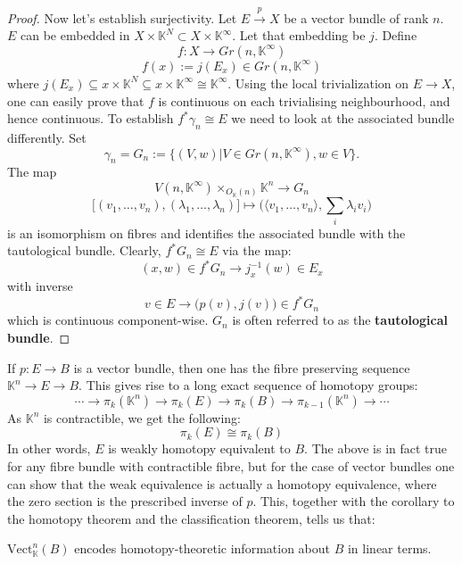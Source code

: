 \documentclass[11pt,a4paper]{article}
\begin{document}
\begin{proof}
Now let's establish surjectivity. Let $E\xrightarrow{p} X$ be a vector bundle of rank $n$. $E$ can be embedded in $X\times \mathbb{K}^N \subset X\times \mathbb{K}^{\infty}$. Let that embedding be $j$. Define
$$f:X \rightarrow Gr(n, \mathbb{K}^{\infty})$$
$$f(x) := j(E_x) \in Gr(n, \mathbb{K}^{\infty})$$
    where $j(E_x) \subseteq x\times \mathbb{K}^N \subseteq x\times \mathbb{K}^{\infty} \cong \mathbb{K}^{\infty}$. Using the local trivialization on $E\rightarrow X$, one can easily prove that $f$ is continuous on each trivialising neighbourhood, and hence continuous. To establish $f^*\gamma_n \cong E$ we need to look at the associated bundle differently. Set
    $$\gamma_n=G_n:= \{(V, w)  |  V \in Gr(n, \mathbb{K}^{\infty}), w\in V\}.$$
The map
$$V(n,\mathbb K^\infty)\times_{O_{\mathbb K}(n)}\mathbb K^n\longrightarrow G_n$$
$$\big[(v_1,\ldots,v_n),(\lambda_1,\ldots,\lambda_n)\big]\longmapsto
\bigg(\langle v_1,\ldots,v_n\rangle,\sum_i\lambda_i v_i\bigg)$$
is an isomorphism on fibres and identifies the associated bundle with the tautological bundle.
    Clearly, $f^*G_n \cong E$ via the map:
$$(x,w)\in f^*G_n \rightarrow j_x^{-1}(w)\in E_x$$
with inverse
$$v\in E \rightarrow \big(p(v), j(v)\big) \in f^*G_n$$
which is continuous component-wise. $G_n$ is often referred to as the \textbf{tautological bundle}.
\end{proof}

\begin{remark}
If $p:E\rightarrow B$ is a vector bundle, then one has the fibre preserving sequence $\mathbb{K}^n \rightarrow E\rightarrow B$. This gives rise to a long exact sequence of homotopy groups:
$$\cdots\rightarrow\pi_k(\mathbb{K}^n) \rightarrow \pi_k(E) \rightarrow \pi_k(B) \rightarrow \pi_{k-1}(\mathbb{K}^{n})\rightarrow \cdots$$
As $\mathbb{K}^n$ is contractible, we get the following:
$$\pi_k(E) \cong \pi_k(B)$$
In other words, $E$ is weakly homotopy equivalent to $B$. The above is in fact true for any fibre bundle with contractible fibre, but for the case of vector bundles one can show that the weak equivalence is actually a homotopy equivalence, where the zero section is the prescribed inverse of $p$. This, together with the corollary to the homotopy theorem and the classification theorem, tells us that:
\end{remark}

\begin{center}

$\text{Vect}_{\mathbb{K}}^n(B)$ encodes homotopy-theoretic information about $B$ in linear terms.

\end{center}
\end{document}
